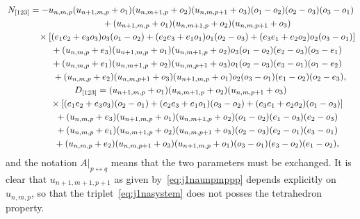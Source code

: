 \documentclass[pdftex]{sigma}
\numberwithin{equation}{section}
\begin{document}
 \begin{gather*}
 N_{[123]}=-u_{n,m,p} (u_{n+1,m,p}+o_1) (u_{n,m+1,p}+o_2) (u_{n,m,p+1}+o_3)(o_1-o_2) (o_2-o_3) (o_3-o_1)
 \nonumber\\
\hphantom{N_{[123]}=}{} +(u_{n+1,m,p}+o_1) (u_{n,m+1,p}+o_2) (u_{n,m,p+1}+o_3)
 \nonumber\\
\hphantom{N_{[123]}=}{} \times
 [ (e_1 e_2+e_3 o_3) o_3 (o_1-o_2)+(e_2 e_3+e_1 o_1) o_1 (o_2-o_3)+(e_3 e_1+e_2 o_2) o_2 (o_3-o_1)]
 \nonumber\\
\hphantom{N_{[123]}=}{} +(u_{n,m,p}+e_3) (u_{n+1,m,p}+o_1) (u_{n,m+1,p}+o_2)
 o_3 (o_1-o_2) (e_2-o_3) (o_3-e_1)
 \nonumber\\
\hphantom{N_{[123]}=}{} +(u_{n,m,p}+e_1) (u_{n,m+1,p}+o_2) (u_{n,m,p+1}+o_3)o_1 (o_2-o_3) (e_3-o_1) (o_1-e_2)
 \nonumber\\
\hphantom{N_{[123]}=}{} +(u_{n,m,p}+e_2) (u_{n,m,p+1}+o_3) (u_{n+1,m,p}+o_1) o_2 (o_3-o_1) (e_1-o_2) (o_2-e_3),\!\!\!\! \label{eq:N123} \\
 D_{[123]}
 =(u_{n+1,m,p}+o_1) (u_{n,m+1,p}+o_2) (u_{n,m,p+1}+o_3)
 \nonumber\\
\hphantom{D_{[123]} =}{} \times [ (e_1 e_2+e_3 o_3) (o_2-o_1) + (e_2 e_3+e_1 o_1) (o_3-o_2)+(e_3 e_1+e_2 o_2) (o_1-o_3)]
 \nonumber\\
\hphantom{D_{[123]} =}{} + (u_{n,m,p}+e_3)(u_{n+1,m,p}+o_1) (u_{n,m+1,p}+o_2)(o_1-o_2) (e_1-o_3) (e_2-o_3)
 \nonumber\\
\hphantom{D_{[123]} =}{} + (u_{n,m,p}+e_1)(u_{n,m+1,p}+o_2) (u_{n,m,p+1}+o_3) (o_2-o_3) (e_2-o_1) (e_3-o_1)
 \nonumber\\
\hphantom{D_{[123]} =}{} + (u_{n,m,p}+e_2)(u_{n,m,p+1}+o_3) (u_{n+1,m,p}+o_1) (o_3-o_1) (e_3-o_2) (e_1-o_2), \label{eq:D123}
 \end{gather*}
and the notation $A|_{p\leftrightarrow q}$ means that the two parameters must be exchanged. It is clear that $u_{n+1,m+1,p+1}$ as given by~\eqref{eq:j1naunpmppp} depends explicitly on $u_{n,m,p}$, so that the triplet~\eqref{eq:j1nasystem} does not posses the tetrahedron property.
\end{document}
